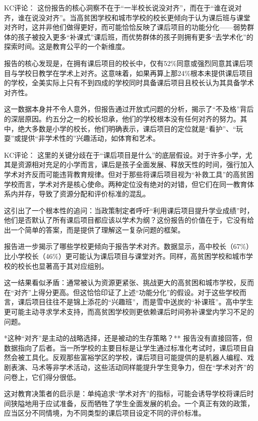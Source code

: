 \documentclass[11pt]{ctexart}
\begin{document}
KC评论： 这份报告的核心洞察不在于“一半校长说没对齐”，而在于“谁在说对齐，谁在说没对齐”。当高贫困学校和城市学校的校长更倾向于认为课后班与课堂对齐时，这并非他们做得更好，而可能恰恰反映了课后项目的功能分化——弱势群体的孩子被投入更多“补课式”课后班，而优势群体的孩子则拥有更多“去学术化”的探索时间。这是教育公平的一个新维度。

报告的核心发现是，在拥有课后项目的校长中，仅有52\%同意或强烈同意其课后项目与学校日教学在学术上对齐。这意味着，如果再算上那24\%根本未提供课后项目的学校，全美实际上只有不到四成的学校同时具备课后项目且校长认为其具备学术对齐性。

这一数据本身并不令人意外，但报告通过开放式问题的分析，揭示了“不及格”背后的深层原因。约五分之一的校长坦承，他们的学校根本没有任何对齐的努力。其中，绝大多数是小学的校长，他们明确表示，课后项目的定位就是“看护”、“玩耍”或提供“非学术性的”兴趣活动，如体育和艺术。

KC评论： 这里的关键分歧在于“课后项目是什么”的底层假设。对于许多小学，尤其是资源相对充足的小学而言，课后是孩子全面发展、释放天性的时间，强行加入学术对齐反而可能违背教育规律。但对于那些将课后项目视为“补救工具”的高贫困学校而言，学术对齐是核心使命。两种定位没有绝对的对错，但它们在同一教育体系内并存，导致了资源分配和评价标准的混乱。

这引出了一个根本性的追问：当政策制定者呼吁“利用课后项目提升学业成绩”时，他们是否默认了所有课后项目都应该以学术为纲？这份报告的价值在于，它没有给出一个简单的答案，而是提供了理解这一复杂问题的框架。

报告进一步揭示了哪些学校更倾向于报告学术对齐。数据显示，高中校长（67\%）比小学校长（46\%）更可能认为课后项目与课堂对齐。同样，高贫困学校和城市学校的校长也显著高于其对应组别。

这一结果看似矛盾：通常被认为资源更紧张、挑战更大的高贫困和城市学校，反而在“对齐”上得分更高。但这恰恰印证了上述“功能分化”的假设。对于这些学校而言，课后项目往往不是锦上添花的“兴趣班”，而是雪中送炭的“补课班”。高中学生更可能主动寻求学术支持，而高贫困学校则更依赖课后时间弥补课堂内学习不足的问题。

*这种“对齐”是主动的战略选择，还是被动的生存策略？** 报告没有直接回答，但数据指向了后者。当一所学校的主要目标是让学生通过标准化考试时，课后项目自然会被工具化。反观那些富裕学区的学校，课后项目可能提供的是机器人编程、戏剧表演、马术等非学术活动，这些活动同样能提升学生竞争力，但在“学术对齐”的问卷上，它们得分很低。

这对教育决策者的启示是：单纯追求“学术对齐”的指标，可能会诱导学校将课后时间狭隘地用于应试准备，反而牺牲了学生全面发展的机会。一个真正有效的政策，应当区分不同情境，为不同类型的课后项目设定不同的评价标准。
\end{document}
